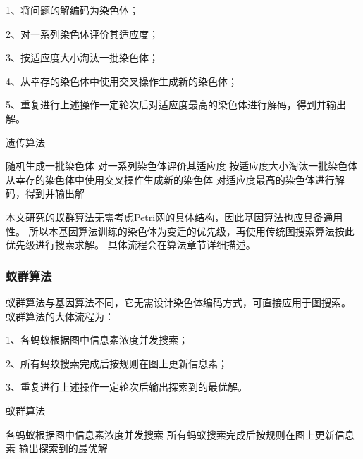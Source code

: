            1、将问题的解编码为染色体；

            2、对一系列染色体评价其适应度；

            3、按适应度大小淘汰一批染色体；

            4、从幸存的染色体中使用交叉操作生成新的染色体；

            5、重复进行上述操作一定轮次后对适应度最高的染色体进行解码，得到并输出解\cite{eiben2015evolutionary}\cite{whitley1994genetic}\cite{mitchell1996introduction}\cite{holland1975adaptation}\cite{goldberg1989genetic}。

            \begin{algorithm}[H]
                \caption{遗传算法}
                \label{alg2-3}
                \begin{algorithmic}
                        \State 随机生成一批染色体
                            \State 对一系列染色体评价其适应度
                            \State 按适应度大小淘汰一批染色体
                            \State 从幸存的染色体中使用交叉操作生成新的染色体
                        \EndWhile
                        \State 对适应度最高的染色体进行解码，得到并输出解
                    \EndProcedure
                \end{algorithmic}
            \end{algorithm}
            本文研究的蚁群算法无需考虑Petri网的具体结构，因此基因算法也应具备通用性。
            所以本基因算法训练的染色体为变迁的优先级，再使用传统图搜索算法按此优先级进行搜索求解。
            具体流程会在算法章节详细描述。
        \subsubsection{蚁群算法}
            蚁群算法与基因算法不同，它无需设计染色体编码方式，可直接应用于图搜索。
            蚁群算法的大体流程为：

            1、各蚂蚁根据图中信息素浓度并发搜索；

            2、所有蚂蚁搜索完成后按规则在图上更新信息素；

            3、重复进行上述操作一定轮次后输出探索到的最优解\cite{blum2003metaheuristics}\cite{li2015survey}\cite{colorni1992distributed}\cite{kennedy1995particle}\cite{dorigo2004ant}。

            \begin{algorithm}[H]
                \caption{蚁群算法}
                \label{alg2-4}
                \begin{algorithmic}
                            \State 各蚂蚁根据图中信息素浓度并发搜索
                            \State 所有蚂蚁搜索完成后按规则在图上更新信息素
                        \EndWhile
                        \State 输出探索到的最优解
                    \EndProcedure
                \end{algorithmic}
            \end{algorithm}

